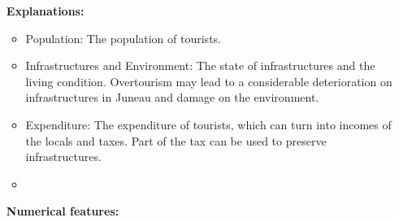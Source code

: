 \documentclass[12pt]{article}  %
\begin{document}
 \begin{itemize}
     \setlength{\parsep}{0ex} %
     \setlength{\topsep}{2ex} %
     \setlength{\itemsep}{1ex} %
 \item [\textbf{Explanations:}]
    \begin{itemize}
     \setlength{\parsep}{0ex} %
     \setlength{\topsep}{2ex} %
        \setlength{\itemsep}{1ex} %
        \item Population: The population of tourists.
        \item Infrastructures and Environment: The state of infrastructures and the living condition. Overtourism may lead to a considerable deterioration on infrastructures in Juneau and damage on the environment.
        \item Expenditure: The expenditure of tourists, which can turn into incomes of the locals and taxes. Part of the tax can be used to preserve infrastructures.
        \item 
\end{itemize}
 \item [\textbf{Numerical features: }]

 


\end{itemize}
\end{document}
